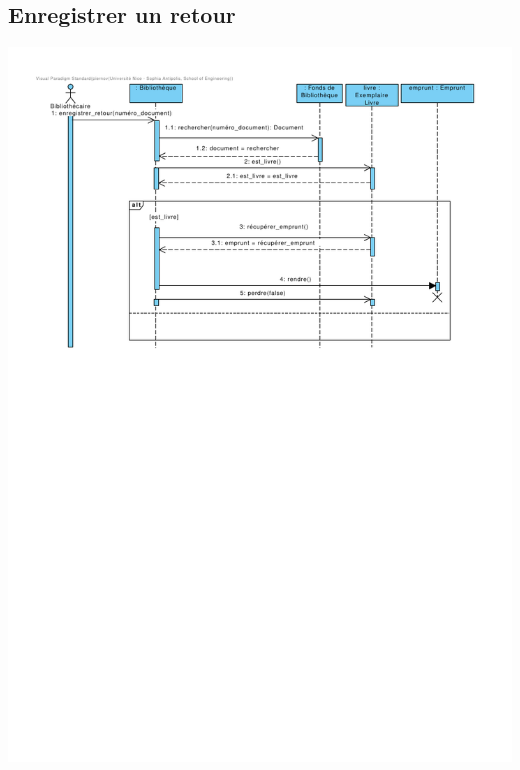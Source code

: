 \documentclass{article}
\begin{document}
\subsection{Enregistrer un retour}
\vspace{-4em}
\hspace*{-9em}\includegraphics[scale=1.5]{sequence_enregistrer_un_retour}
\vspace*{-4em}
\end{document}
